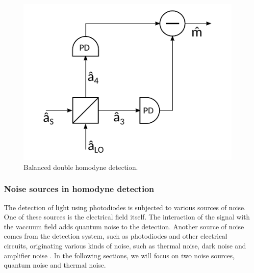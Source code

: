 %
\begin{figure}[H]
\label{fig:scheme_homodyne}
\centering
\includegraphics{./sdf/quantum_noise/figures/scheme_homodyne.pdf}
\caption{Balanced double homodyne detection.}
\end{figure}
%
%
%
\subsubsection{Noise sources in homodyne detection}
The detection of light using photodiodes is subjected to various sources of noise. One of these sources is the electrical field itself. The interaction of the signal with the vaccuum field adds quantum noise to the detection.
Another source of noise comes from the detection system, such as photodiodes and other electrical circuits, originating various kinds of noise, such as thermal noise, dark noise and amplifier noise
\cite{hans2004}.
In the following sections, we will focus on two noise sources, quantum noise and thermal noise.
%
%
%
